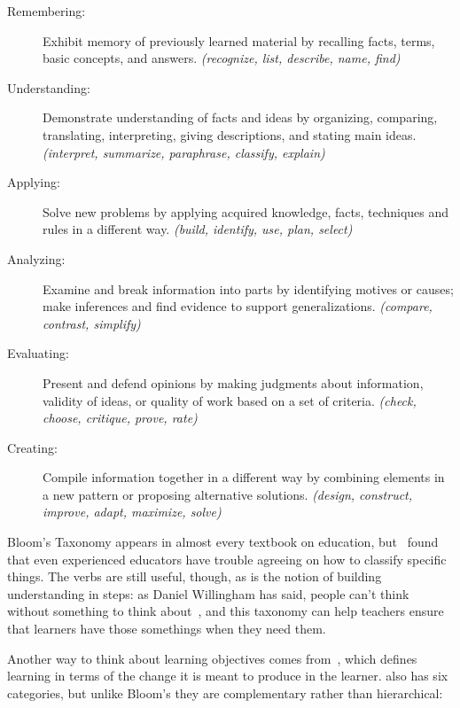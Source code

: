 \begin{description}

\item[Remembering:]
  Exhibit memory of previously learned material by recalling facts, terms, basic concepts, and answers.
  \emph{(recognize, list, describe, name, find)}

\item[Understanding:]
  Demonstrate understanding of facts and ideas
  by organizing, comparing, translating, interpreting, giving descriptions, and stating main ideas.
  \emph{(interpret, summarize, paraphrase, classify, explain)}

\item[Applying:]
  Solve new problems by applying acquired knowledge, facts, techniques and rules in a different way.
  \emph{(build, identify, use, plan, select)}

\item[Analyzing:]
  Examine and break information into parts by identifying motives or causes;
  make inferences and find evidence to support generalizations.
  \emph{(compare, contrast, simplify)}

\item[Evaluating:]
  Present and defend opinions by making judgments about information,
  validity of ideas,
  or quality of work based on a set of criteria.
  \emph{(check, choose, critique, prove, rate)}

\item[Creating:]
  Compile information together in a different way by combining elements in a new pattern or proposing alternative solutions.
  \emph{(design, construct, improve, adapt, maximize, solve)}

\end{description}

Bloom's Taxonomy appears in almost every textbook on education,
but~\cite{Masa2018} found that
even experienced educators have trouble agreeing on how to classify specific things.
The verbs are still useful,
though,
as is the notion of building understanding in steps:
as Daniel Willingham has said,
people can't think without something to think about~\cite{Will2010},
and this taxonomy can help teachers ensure that learners have those somethings when they need them.

Another way to think about learning objectives comes from~\cite{Fink2013},
which defines learning in terms of the change it is meant to produce in the learner.
 also has six categories,
but unlike Bloom's they are complementary rather than hierarchical:

